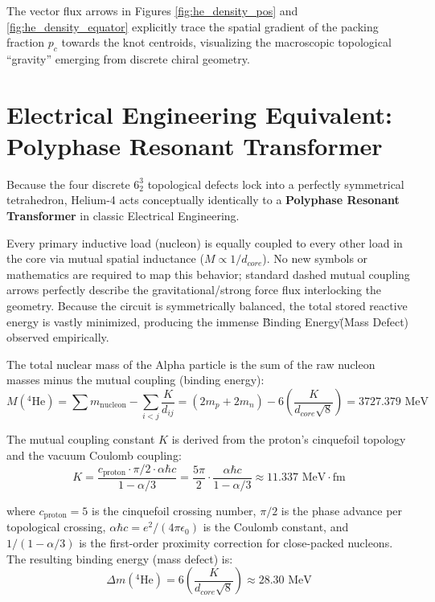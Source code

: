 The vector flux arrows in Figures \ref{fig:he_density_pos} and \ref{fig:he_density_equator} explicitly trace the spatial gradient of the packing fraction $p_c$ towards the knot centroids, visualizing the macroscopic topological ``gravity'' emerging from discrete chiral geometry.

\section{Electrical Engineering Equivalent: Polyphase Resonant Transformer}
Because the four discrete $6^3_2$ topological defects lock into a perfectly symmetrical tetrahedron, Helium-4 acts conceptually identically to a \textbf{Polyphase Resonant Transformer} in classic Electrical Engineering.

Every primary inductive load (nucleon) is equally coupled to every other load in the core via mutual spatial inductance ($M \propto 1/d_{core}$). No new symbols or mathematics are required to map this behavior; standard dashed mutual coupling arrows perfectly describe the gravitational/strong force flux interlocking the geometry. Because the circuit is symmetrically balanced, the total stored reactive energy is vastly minimized, producing the immense \"Binding Energy\" (Mass Defect) observed empirically.

The total nuclear mass of the Alpha particle is the sum of the raw nucleon masses minus the mutual coupling (binding energy):
\begin{equation}
    M(^{4}\text{He}) = \sum m_{\text{nucleon}} - \sum_{i<j} \frac{K}{d_{ij}} = (2m_p + 2m_n) - 6 \left( \frac{K}{d_{core}\sqrt{8}} \right) = 3727.379 \text{ MeV}
\end{equation}

The mutual coupling constant $K$ is derived from the proton's cinquefoil topology and the vacuum Coulomb coupling:
\begin{equation}
    K = \frac{c_{\text{proton}} \cdot \pi/2 \cdot \alpha \hbar c}{1 - \alpha/3} = \frac{5\pi}{2} \cdot \frac{\alpha \hbar c}{1 - \alpha/3} \approx 11.337 \text{ MeV}\cdot\text{fm}
\end{equation}

where $c_{\text{proton}} = 5$ is the cinquefoil crossing number, $\pi/2$ is the phase advance per topological crossing, $\alpha\hbar c = e^2/(4\pi\epsilon_0)$ is the Coulomb constant, and $1/(1-\alpha/3)$ is the first-order proximity correction for close-packed nucleons. The resulting binding energy (mass defect) is:
\begin{equation}
    \Delta m(^{4}\text{He}) = 6 \left( \frac{K}{d_{core}\sqrt{8}} \right) \approx 28.30 \text{ MeV}
\end{equation}

